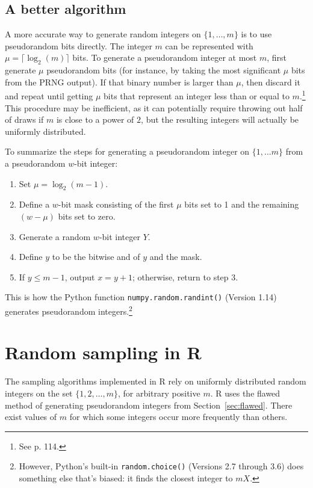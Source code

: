 \documentclass[12pt]{article}
\begin{document}
\subsection{A better algorithm}
A more accurate way to generate random integers on $\{1, \dots, m\}$ is to use pseudorandom bits directly. 
The integer $m$ can be represented with $\mu = \lceil \log_2(m) \rceil$ bits. 
To generate a pseudorandom integer at most $m$, first generate $\mu$ pseudorandom bits (for instance, by taking the most significant $\mu$ bits from the PRNG output).  
If that binary number is larger than $\mu$, then discard it and repeat until getting $\mu$ bits that represent an integer less than or equal to $m$.\footnote{
See \citet{knuth_art_1997} p. 114.
}
This procedure may be inefficient, as it can potentially require throwing out half of draws if $m$ is close to a power of $2$, but the resulting integers will actually be uniformly distributed.

To summarize the steps for generating a pseudorandom integer on $\{1, \ldots m\}$ from a pseudorandom $w$-bit integer:
\begin{enumerate}
\item Set $\mu = \log_2(m-1)$.
\item Define a $w$-bit mask consisting of the first $\mu$ bits set to 1 and the remaining $(w-\mu)$ bits set to zero.
\item Generate a random $w$-bit integer $Y$.
\item Define $y$ to be the bitwise and of $y$ and the mask.
\item If $y \le m-1$, output $x = y+1$; otherwise, return to step 3.
\end{enumerate}
This is how the Python function \texttt{numpy.random.randint()} (Version 1.14) generates pseudorandom integers.\footnote{
However, Python's built-in \texttt{random.choice()} (Versions 2.7 through 3.6) does something else that's biased: it finds the closest integer to $mX$.
}

\section{Random sampling in R}\label{sec:sample}
The sampling algorithms implemented in R rely on uniformly distributed random integers on the set $\{1, 2, \dots, m\}$, for arbitrary positive $m$. 
R uses the flawed method of generating pseudorandom integers from Section~\ref{sec:flawed}.
There exist values of $m$ for which some integers occur more frequently than others.
\end{document}
